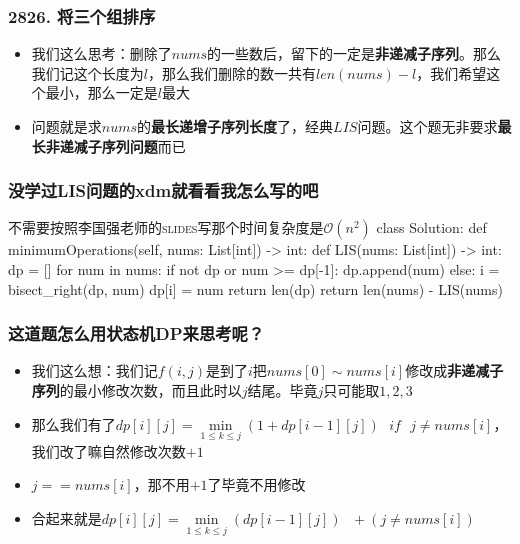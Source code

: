 \begin{frame}[fragile]          %
  \frametitle{\textsc{2826. 将三个组排序}}
  \begin{itemize}
    \item 我们这么思考：删除了$nums$的一些数后，留下的一定是\textbf{非递减子序列}。那么我们记这个长度为$l$，那么我们删除的数一共有$len(nums)-l$，我们希望这个最小，那么一定是$l$最大
    \item 问题就是求$nums$的\textbf{最长递增子序列长度}了，经典$LIS$问题。这个题无非要求\textbf{最长非递减子序列问题}而已
  \end{itemize}
\end{frame}


\begin{frame}[fragile]
  \frametitle{没学过\textsc{LIS}问题的xdm就看看我怎么写的吧}
  \begin{codeblock}[language=python]{不需要按照李国强老师的\textsc{slides}写那个时间复杂度是$\mathcal{O}(n^2)$}
class Solution:
    def minimumOperations(self, nums: List[int]) -> int:
        def LIS(nums: List[int]) -> int:
            dp = []
            for num in nums:
                if not dp or num >= dp[-1]:
                    dp.append(num)
                else:
                    i = bisect_right(dp, num)
                    dp[i] = num
            return len(dp)
        return len(nums) - LIS(nums)
  \end{codeblock}
\end{frame}


\begin{frame}[fragile]          %
  \frametitle{这道题怎么用状态机\textsc{DP}来思考呢？}
  \begin{itemize}
    \item 我们这么想：我们记$f(i,j)$是到了$i$把$nums[0]\sim nums[i]$修改成\textbf{非递减子序列}的最小修改次数，而且此时以$j$结尾。毕竟$j$只可能取$1,2,3$
    \item 那么我们有了$dp[i][j]=\min\limits_{1\leq k \leq j}(1+dp[i-1][j])\text{ } if\text{ }j \neq nums[i]$，我们改了嘛自然修改次数$+1$
    \item $j == nums[i]$，那不用$+1$了毕竟不用修改
    \item 合起来就是$dp[i][j]=\min\limits_{1\leq k \leq j}(dp[i-1][j])\text{ } + (j\neq nums[i])$
  \end{itemize}
\end{frame}


